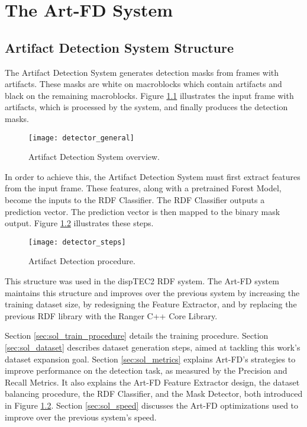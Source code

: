 \chapter{The Art-FD System}
\label{ch:solucion}

\section{Artifact Detection System Structure}
\label{sec:sol_struct}

The Artifact Detection System generates detection masks from frames with artifacts. These masks are white on macroblocks which contain artifacts and black on the remaining macroblocks. Figure \ref{fig:detector_overview} illustrates the input frame with artifacts, which is processed by the system, and finally produces the detection masks.

\begin{figure} [!h]
  \centering
  
  \texttt{[image: detector\_general]}
  
  \caption{Artifact Detection System overview.}
  \label{fig:detector_overview}

\end{figure}

In order to achieve this, the Artifact Detection System must first extract features from the input frame. These features, along with a pretrained Forest Model, become the inputs to the RDF Classifier. The RDF Classifier outputs a prediction vector. The prediction vector is then mapped to the binary mask output. Figure \ref{fig:detector_steps} illustrates these steps.

\begin{figure} [!h]
  \centering
  
  \texttt{[image: detector\_steps]}
  
  \caption{Artifact Detection procedure. }
  \label{fig:detector_steps}

\end{figure}

This structure was used in the dispTEC2 RDF system. The Art-FD system maintains this structure and improves over the previous system by increasing the training dataset size, by redesigning the Feature Extractor, and by replacing the previous RDF library with the Ranger C++ Core Library.

Section \ref{sec:sol_train_procedure} details the training procedure. Section \ref{sec:sol_dataset} describes dataset generation steps, aimed at tackling this work's dataset expansion goal. Section \ref{sec:sol_metrics} explains Art-FD's strategies to improve performance on the detection task, as measured by the Precision and Recall Metrics. It also explains the Art-FD Feature Extractor design, the dataset balancing procedure, the RDF Classifier, and the Mask Detector, both introduced in Figure \ref{fig:detector_steps}. Section \ref{sec:sol_speed} discusses the Art-FD optimizations used to improve over the previous system's speed.

